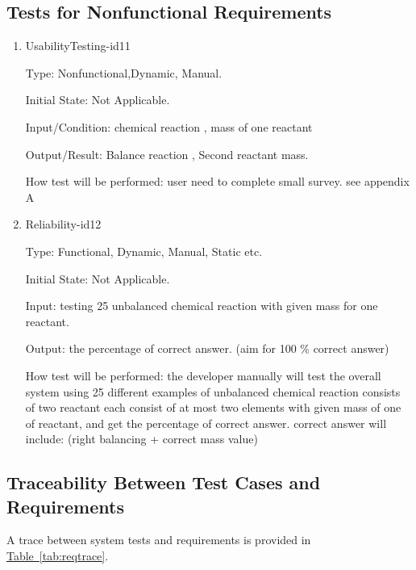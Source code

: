 \documentclass[12pt, titlepage]{article}
\begin{document}
\subsection{Tests for Nonfunctional Requirements}

\begin{enumerate}

\item{ UsabilityTesting-id11\\}

Type:  Nonfunctional,Dynamic, Manual.
					
Initial State:  Not Applicable.
					
Input/Condition: chemical reaction ,  mass of one reactant
					
Output/Result: Balance reaction , Second reactant mass.
					
How test will be performed: user need to complete small survey. see appendix A 
					
\item{Reliability-id12\\}

Type: Functional, Dynamic, Manual, Static etc.
					
Initial State:  Not Applicable.
					
Input: testing 25 unbalanced chemical reaction with given mass for one reactant.
					
Output: the percentage of correct answer. (aim for 100 \% correct answer) 
					
How test will be performed: the developer manually will test the overall system using 25 different examples of unbalanced chemical reaction consists of two reactant each consist of at most two elements with given mass of one of reactant, and get the percentage of correct answer. correct answer will include: (right balancing + correct mass value) 

\end{enumerate}

\subsection{Traceability Between Test Cases and Requirements}

A trace between system tests and requirements is provided in 
\hyperref[tab:reqtrace]{Table~\ref*{tab:reqtrace}}.
\end{document}
